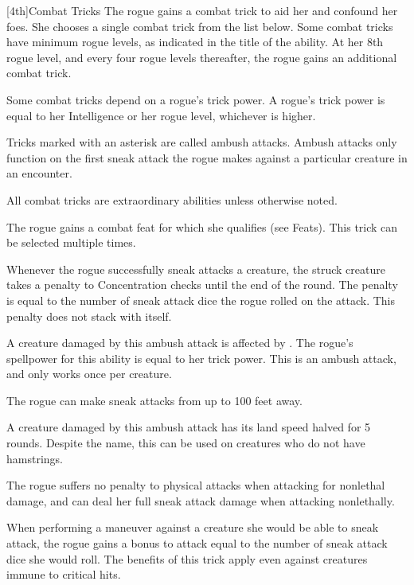 [4th]{Combat Tricks}
The rogue gains a combat trick to aid her and confound her foes.
She chooses a single combat trick from the list below.
Some combat tricks have minimum rogue levels, as indicated in the title of the ability.
At her 8th rogue level, and every four rogue levels thereafter, the rogue gains an additional combat trick.

Some combat tricks depend on a rogue's trick power.
A rogue's trick power is equal to her Intelligence or her rogue level, whichever is higher.

Tricks marked with an asterisk are called ambush attacks.
Ambush attacks only function on the first sneak attack the rogue makes against a particular creature in an encounter.

All combat tricks are extraordinary abilities unless otherwise noted.

The rogue gains a combat feat for which she qualifies (see Feats).
This trick can be selected multiple times.

Whenever the rogue successfully sneak attacks a creature, the struck creature takes a penalty to Concentration checks until the end of the round.
The penalty is equal to the number of sneak attack dice the rogue rolled on the attack.
This penalty does not stack with itself.

A creature damaged by this ambush attack is affected by .
The rogue's spellpower for this ability is equal to her trick power.
This is an ambush attack, and only works once per creature.

The rogue can make sneak attacks from up to 100 feet away.

A creature damaged by this ambush attack has its land speed halved for 5 rounds.
Despite the name, this can be used on creatures who do not have hamstrings.

The rogue suffers no penalty to physical attacks when attacking for nonlethal damage, and can deal her full sneak attack damage when attacking nonlethally.


When performing a maneuver against a creature she would be able to sneak attack, the rogue gains a bonus to attack equal to the number of sneak attack dice she would roll.
The benefits of this trick apply even against creatures immune to critical hits.

